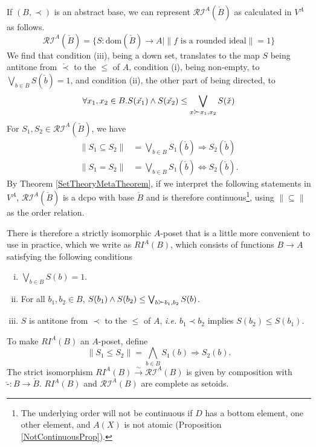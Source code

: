 \documentclass{lmcs}
\newcommand{\blank}{\ensuremath{{\mbox{-}}}}
\newcommand{\dom}{\ensuremath{\mathrm{dom}}}
\newcommand{\RI}{\mathcal{RI}} %
\newcommand{\isoarrow}{\stackrel{\sim}{\rightarrow}}
\newcommand{\bvs}[1]{\| {#1} \|}
\newcommand{\cerp}{\mathbin{\reflectbox{$\prec$}}}
\begin{document}
\begin{defi}
\label{BVRIDef}
If $(B,\prec)$ is an abstract base, we can represent $\RI^A(\check{B})$ as calculated in $V^A$ as follows.
\[
\RI^A(\check{B}) = \{ S : \dom(\check{B}) \rightarrow A \mid \bvs{f \text{ is a rounded ideal}} = 1 \}
\]
We find that condition (iii), being a down set, translates to the map $S$ being antitone from $\check{\prec}$ to the $\leq$ of $A$, condition (i), being non-empty, to $\bigvee_{b \in B}S(\check{b}) = 1$, and condition (ii), the other part of being directed, to 
\[
\forall x_1,x_2 \in B. S(\check{x_1}) \land S(\check{x_2}) \leq \bigvee_{x \cerp x_1,x_2} S(\check{x})
\]
For $S_1,S_2 \in \RI^A(\check{B})$, we have
\begin{align*}
\bvs{S_1 \subseteq S_2} &= \bigvee_{b \in B} S_1(\check{b}) \Rightarrow S_2(\check{b}) \\
\bvs{S_1 = S_2} &= \bigvee_{b \in B} S_1(\check{b}) \Leftrightarrow S_2(\check{b}).
\end{align*}
By Theorem \ref{SetTheoryMetaTheorem}, if we interpret the following statements in $V^A$, $\RI^A(\check{B})$ is a dcpo with base $\check{B}$ and is therefore continuous\footnote{The underlying order will not be continuous if $D$ has a bottom element, one other element, and $A(X)$ is not atomic (Proposition \ref{NotContinuousProp}).}, using $\bvs{{\subseteq}}$ as the order relation. 

There is therefore a strictly isomorphic $A$-poset that is a little more convenient to use in practice, which we write as $RI^A(B)$, which consists of functions $B \rightarrow A$ satisfying the following conditions
\begin{enumerate}[(i)]
\item $\bigvee_{b \in B} S(b) = 1$.
\item For all $b_1,b_2 \in B$, $S(b_1) \land S(b_2) \leq \bigvee_{b \cerp b_1,b_2} S(b)$. 
\item $S$ is antitone from $\prec$ to the $\leq$ of $A$, \emph{i.e.} $b_1 \prec b_2$ implies $S(b_2) \leq S(b_1)$. 
\end{enumerate}
To make $RI^A(B)$ an $A$-poset, define 
\[
\bvs{S_1 \leq S_2} = \bigwedge_{b \in B} S_1(b) \Rightarrow S_2(b).
\]
The strict isomorphism $RI^A(B) \isoarrow \RI^A(B)$ is given by composition with $\check{\blank} : B \rightarrow \check{B}$. $RI^A(B)$ and $\RI^A(B)$ are complete as setoids. 
\end{defi}
\end{document}

